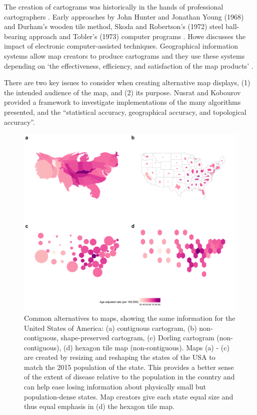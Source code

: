 \documentclass{monashthesis}
\begin{document}
The creation of cartograms was historically in the hands of professional cartographers \autocite{CD}. Early approaches by John Hunter and Jonathan Young (1968) and Durham's wooden tile method, Skoda and Robertson's (1972) steel ball-bearing approach and Tobler's (1973) computer programs \autocite{ACTUC}. Howe \autocite{HEDP} discusses the impact of electronic computer-assisted techniques. Geographical information systems allow map creators to produce cartograms and they use these systems depending on `the effectiveness, efficiency, and satisfaction of the map products' \autocite{CD}.

There are two key issues to consider when creating alternative map displays, (1) the intended audience of the map, and (2) its purpose. Nusrat and Kobourov \autocite{SAIC} provided a framework to investigate implementations of the many algorithms presented, and the ``statistical accuracy, geographical accuracy, and topological accuracy''.

\begin{figure}

{\centering \includegraphics[width=1\linewidth]{figures/02-literature/usa_grid} 

}

\caption{ Common alternatives to maps, showing the same information for the United States of America: (a) contiguous cartogram, (b) non-contiguous, shape-preserved cartogram, (c)  Dorling cartogram (non-contiguous), (d) hexagon tile map (non-contiguous). Maps (a) - (c) are created by resizing and reshaping the states of the USA to match the 2015 population of the state. This provides a better sense of the extent of disease relative to the population in the country and can help ease losing information about physically small but population-dense states. Map creators give each state equal size and thus equal emphasis in (d) the hexagon tile map.}\label{fig:ggcartograms}
\end{figure}
\end{document}
